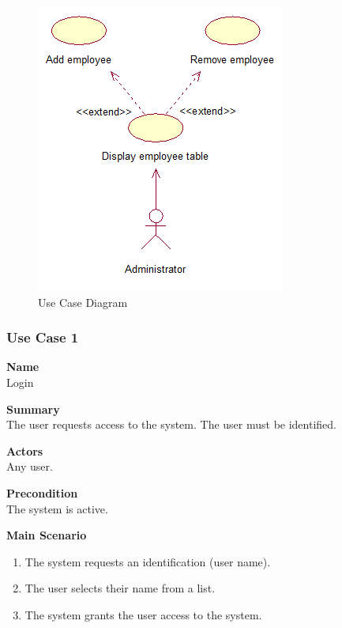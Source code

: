 \documentclass[12pt]{article}
\begin{document}
\begin{figure}[htbp]
\begin{center} \includegraphics[scale=1]{diagrams/usecase1_2c.png} \end{center}
\caption{Use Case Diagram}
\label{fig:use-case-diagram}
\end{figure}

\subsubsection{Use Case 1} \label{uc:1}

\noindent
{\bf Name}\\
Login

\noindent
{\bf Summary}\\
The user requests access to the system. The user must be identified.

\noindent
{\bf Actors}\\
Any user.

\noindent
{\bf Precondition}\\
The system is active.

\noindent
{\bf Main Scenario}\\
\vspace*{-0.35in}
\begin{enumerate}
\item The system requests an identification (user name).
\vspace*{-0.1in}
\item The user selects their name from a list.
\vspace*{-0.1in}
\item The system grants the user access to the system.
\end{enumerate}
\vspace*{-0.1in}
\end{document}
